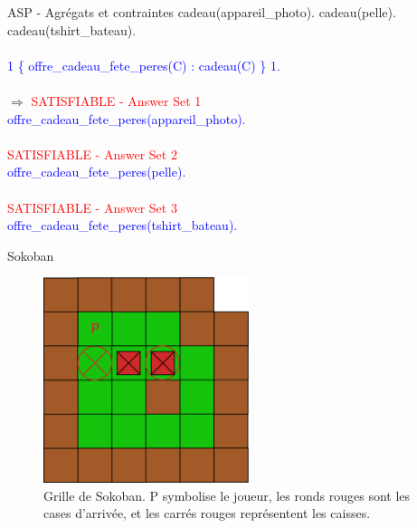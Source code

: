 \documentclass{beamer}
\begin{document}
\begin{frame}{ASP - Agrégats et contraintes}
	cadeau(appareil\_photo). cadeau(pelle). cadeau(tshirt\_bateau).\\
	\pause
	\textcolor{white}{cheatcode}\\
	\textcolor{blue}{1 \{ offre\_cadeau\_fete\_peres(C) : cadeau(C) \} 1.\\}
	\pause
	\textcolor{white}{cheatcode}\\
	$\Rightarrow$ \textcolor{red}{SATISFIABLE - Answer Set 1\\}
		      \textcolor{blue}{offre\_cadeau\_fete\_peres(appareil\_photo).}\\
		      \textcolor{white}{cheatcode}\\
		      \pause
		      \textcolor{red}{SATISFIABLE - Answer Set 2\\}
		      \textcolor{blue}{offre\_cadeau\_fete\_peres(pelle).}\\
		      \textcolor{white}{cheatcode}\\
		      \pause
		      \textcolor{red}{SATISFIABLE - Answer Set 3\\}
		      \textcolor{blue}{offre\_cadeau\_fete\_peres(tshirt\_bateau).}
\end{frame}

\begin{frame}{Sokoban}
	\begin{figure}[!h]
		\includegraphics[width=6cm]{Diagram1.eps}
		\caption{Grille de Sokoban. P symbolise le joueur, les ronds rouges sont les cases d'arrivée, et les carrés rouges représentent les caisses.}
		\label{label-figure3}
	\end{figure}
\end{frame}
\end{document}
